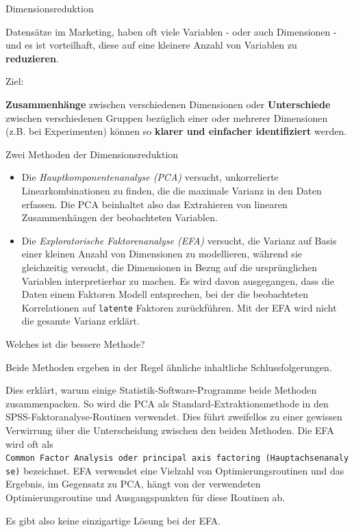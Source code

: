 \documentclass[12pt,ngerman,a4paper,ignorenonframetext,]{beamer}
\providecommand{\tightlist}{%
  \setlength{\itemsep}{0pt}\setlength{\parskip}{0pt}}
\begin{document}
\begin{frame}{Dimensionsreduktion}
\protect\hypertarget{dimensionsreduktion}{}

Datensätze im Marketing, haben oft viele Variablen - oder auch
Dimensionen - und es ist vorteilhaft, diese auf eine kleinere Anzahl von
Variablen zu \textbf{reduzieren}.

Ziel:

\textbf{Zusammenhänge} zwischen verschiedenen Dimensionen oder
\textbf{Unterschiede} zwischen verschiedenen Gruppen bezüglich einer
oder mehrerer Dimensionen (z.\thinspace{}B. bei Experimenten) können so
\textbf{klarer und einfacher identifiziert} werden.

\end{frame}

\begin{frame}[fragile]{Zwei Methoden der Dimensionsreduktion}
\protect\hypertarget{zwei-methoden-der-dimensionsreduktion}{}

\begin{itemize}
\tightlist
\item
  Die \emph{Hauptkomponentenanalyse (PCA)} versucht, unkorrelierte
  Linearkombinationen zu finden, die die maximale Varianz in den Daten
  erfassen. Die PCA beinhaltet also das Extrahieren von linearen
  Zusammenhängen der beobachteten Variablen.
\item
  Die \emph{Exploratorische Faktorenanalyse (EFA)} versucht, die Varianz
  auf Basis einer kleinen Anzahl von Dimensionen zu modellieren, während
  sie gleichzeitig versucht, die Dimensionen in Bezug auf die
  ursprünglichen Variablen interpretierbar zu machen. Es wird davon
  ausgegangen, dass die Daten einem Faktoren Modell entsprechen, bei der
  die beobachteten Korrelationen auf \texttt{latente} Faktoren
  zurückführen. Mit der EFA wird nicht die gesamte Varianz erklärt.
\end{itemize}

\end{frame}

\begin{frame}[fragile]{Welches ist die bessere Methode?}
\protect\hypertarget{welches-ist-die-bessere-methode}{}

Beide Methoden ergeben in der Regel ähnliche inhaltliche
Schlussfolgerungen.

Dies erklärt, warum einige Statistik-Software-Programme beide Methoden
zusammenpacken. So wird die PCA als Standard-Extraktionsmethode in den
SPSS-Faktoranalyse-Routinen verwendet. Dies führt zweifellos zu einer
gewissen Verwirrung über die Unterscheidung zwischen den beiden
Methoden. Die EFA wird oft als
\texttt{Common\ Factor\ Analysis\ oder\ principal\ axis\ factoring\ (Hauptachsenanalyse)}
bezeichnet. EFA verwendet eine Vielzahl von Optimierungsroutinen und das
Ergebnis, im Gegensatz zu PCA, hängt von der verwendeten
Optimierungsroutine und Ausgangspunkten für diese Routinen ab.

Es gibt also keine einzigartige Lösung bei der EFA.

\end{frame}
\end{document}
